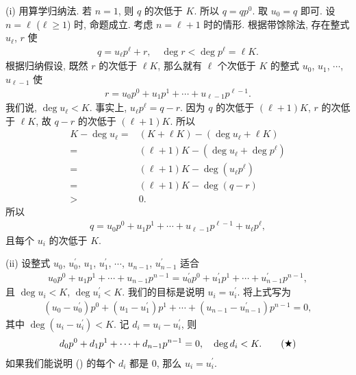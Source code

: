 \begin{pf}
    (i) 用算学归纳法. 若 $n = 1$, 则 $q$ 的次低于 $K$. 所以 $q = q p^0$. 取 $u_0 = q$ 即可. 设 $n = \ell$ ($\ell \geq 1$) 时, 命题成立. 考虑 $n = \ell + 1$ 时的情形. 根据带馀除法, 存在整式 $u_\ell$, $r$ 使
    \begin{align*}
        q = u_\ell p^\ell + r, \quad \deg r < \deg p^\ell = \ell K.
    \end{align*}
    根据归纳假设, 既然 $r$ 的次低于 $\ell K$, 那么就有 $\ell$ 个次低于 $K$ 的整式 $u_0$, $u_1$, $\cdots$, $u_{\ell - 1}$ 使
    \begin{align*}
        r = u_0 p^0 + u_1 p^1 + \cdots + u_{\ell - 1} p^{\ell - 1}.
    \end{align*}
    我们说, $\deg u_\ell < K$. 事实上, $u_\ell p^\ell = q - r$. 因为 $q$ 的次低于 $(\ell + 1)K$, $r$ 的次低于 $\ell K$, 故 $q - r$ 的次低于 $(\ell + 1)K$. 所以
    \begin{align*}
        K - \deg u_\ell
        = {} & (K + \ell K) - (\deg u_\ell + \ell K)     \\
        = {} & (\ell + 1)K - (\deg u_\ell + \deg p^\ell) \\
        = {} & (\ell + 1)K - \deg {(u_\ell p^\ell)}      \\
        = {} & (\ell + 1)K - \deg {(q - r)}              \\
        > {} & 0.
    \end{align*}
    所以
    \begin{align*}
        q = u_0 p^0 + u_1 p^1 + \cdots + u_{\ell - 1} p^{\ell - 1} + u_\ell p^\ell,
    \end{align*}
    且每个 $u_i$ 的次低于 $K$.

    (ii) 设整式 $u_0$, $u_0^{\prime}$, $u_1$, $u_1^{\prime}$, $\cdots$, $u_{n-1}$, $u_{n-1}^{\prime}$ 适合
    \begin{align*}
        u_0 p^0 + u_1 p^1 + \cdots + u_{n-1} p^{n-1} = u_0^{\prime} p^0 + u_1^{\prime} p^1 + \cdots + u_{n-1}^{\prime} p^{n-1},
    \end{align*}
    且 $\deg u_i < K$, $\deg u_i^{\prime} < K$. 我们的目标是说明 $u_i = u_i^{\prime}$. 将上式写为
    \begin{align*}
        (u_0 - u_0^{\prime}) p^0 + (u_1 - u_1^{\prime}) p^1 + \cdots + (u_{n-1} - u_{n-1}^{\prime}) p^{n-1} = 0,
    \end{align*}
    其中 $\deg {(u_i - u_i^{\prime})} < K$. 记 $d_i = u_i - u_i^{\prime}$, 则
    \begin{align*}
        d_0 p^0 + d_1 p^1 + \cdots + d_{n-1} p^{n-1} = 0, \quad \deg d_i < K. \tag*{(\ding{72})}
    \end{align*}
    如果我们能说明 () 的每个 $d_i$ 都是 $0$, 那么 $u_i = u_i^{\prime}$.


\end{pf}
